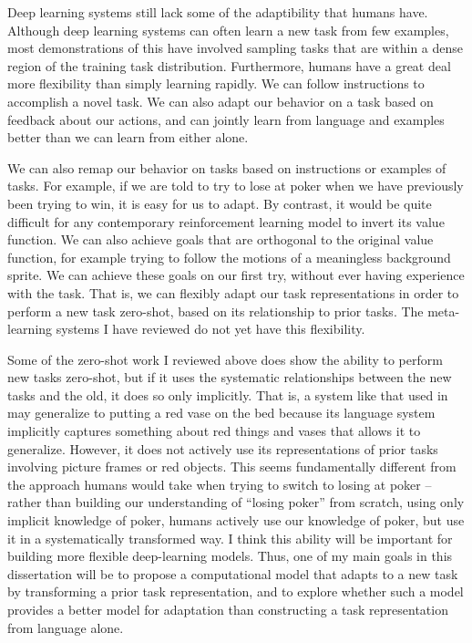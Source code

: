 Deep learning systems still lack some of the adaptibility that humans have. Although deep learning systems can often learn a new task from few examples, most demonstrations of this have involved sampling tasks that are within a dense region of the training task distribution. Furthermore, humans have a great deal more flexibility than simply learning rapidly. We can follow instructions to accomplish a novel task. We can also adapt our behavior on a task based on feedback about our actions, and can jointly learn from language and examples better than we can learn from either alone. \par
We can also remap our behavior on tasks based on instructions or examples of tasks. For example, if we are told to try to lose at poker when we have previously been trying to win, it is easy for us to adapt. By contrast, it would be quite difficult for any contemporary reinforcement learning model to invert its value function. We can also achieve goals that are orthogonal to the original value function, for example trying to follow the motions of a meaningless background sprite. We can achieve these goals on our first try, without ever having experience with the task. That is, we can flexibly adapt our task representations in order to perform a new task zero-shot, based on its relationship to prior tasks. The meta-learning systems I have reviewed do not yet have this flexibility. \par
Some of the zero-shot work I reviewed above does show the ability to perform new tasks zero-shot, but if it uses the systematic relationships between the new tasks and the old, it does so only implicitly. That is, a system like that used in \citet{Hill2019a} may generalize to putting a red vase on the bed because its language system implicitly captures something about red things and vases that allows it to generalize. However, it does not actively use its representations of prior tasks involving picture frames or red objects. This seems fundamentally different from the approach humans would take when trying to switch to losing at poker -- rather than building our understanding of ``losing poker'' from scratch, using only implicit knowledge of poker, humans actively use our knowledge of poker, but use it in a systematically transformed way. I think this ability will be important for building more flexible deep-learning models.  Thus, one of my main goals in this dissertation will be to propose a computational model that adapts to a new task by transforming a prior task representation, and to explore whether such a model provides a better model for adaptation than constructing a task representation from language alone. \par
